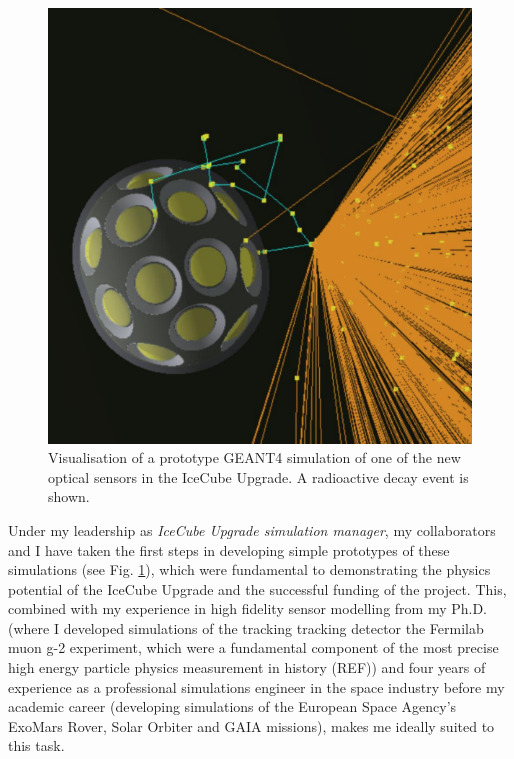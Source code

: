 \documentclass[a4paper,11pt]{article}
\begin{document}
\begin{figure} %
    \centering
    \includegraphics[trim=0.0cm 0.0cm 0.cm 1.0cm, clip=true, width=\linewidth]{images/mDOM_noise.png}
    \caption{Visualisation of a prototype GEANT4 simulation of one of the new optical sensors in the IceCube Upgrade. A radioactive decay event is shown.}
    \label{fig:mDOM_sim}
\end{figure}

Under my leadership as \textit{IceCube Upgrade simulation manager}, my collaborators and I have taken the first steps in developing simple prototypes of these simulations (see Fig. \ref{fig:mDOM_sim}), which were fundamental to demonstrating the physics potential of the IceCube Upgrade and the successful funding of the project. This, combined with my experience in high fidelity sensor modelling from my Ph.D. (where I developed simulations of the tracking tracking detector the Fermilab muon g-2 experiment, which were a fundamental component of the most precise high energy particle physics measurement in history (REF)) and four years of experience as a professional simulations engineer in the space industry before my academic career (developing simulations of the European Space Agency's ExoMars Rover, Solar Orbiter and GAIA missions), makes me ideally suited to this task. 
\end{document}

